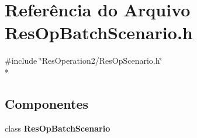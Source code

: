 \section{Referência do Arquivo Res\+Op\+Batch\+Scenario.\+h}
\label{_res_op_batch_scenario_8h}
{\ttfamily \#include \char`\"{}Res\+Operation2/\+Res\+Op\+Scenario.\+h\char`\"{}}\\*
\subsection*{Componentes}
\begin{DoxyCompactItemize}
\item 
class {\bf Res\+Op\+Batch\+Scenario}
\end{DoxyCompactItemize}
